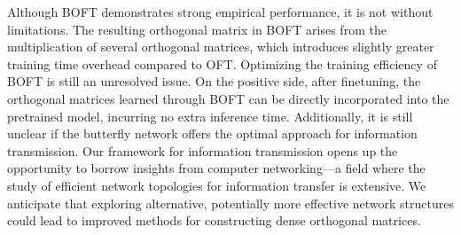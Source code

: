Although BOFT demonstrates strong empirical performance, it is not without limitations. The resulting orthogonal matrix in BOFT arises from the multiplication of several orthogonal matrices, which introduces slightly greater training time overhead compared to OFT. Optimizing the training efficiency of BOFT is still an unresolved issue. On the positive side, after finetuning, the orthogonal matrices learned through BOFT can be directly incorporated into the pretrained model, incurring no extra inference time. Additionally, it is still unclear if the butterfly network offers the optimal approach for information transmission. Our framework for information transmission opens up the opportunity to borrow insights from computer networking—a field where the study of efficient network topologies for information transfer is extensive. We anticipate that exploring alternative, potentially more effective network structures could lead to improved methods for constructing dense orthogonal matrices.

